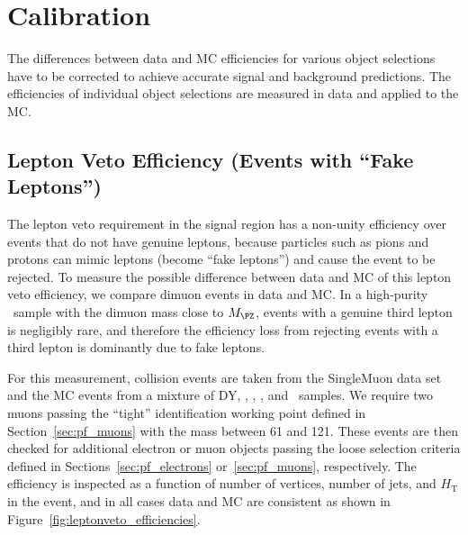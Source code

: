 \chapter{Calibration}
\label{chap:calibration}

The differences between data and MC efficiencies for various object selections have to be corrected to achieve accurate signal and background predictions.
The efficiencies of individual object selections are measured in data and applied to the MC.

\section{Lepton Veto Efficiency (Events with ``Fake Leptons'')}
\label{sec:fake_lepton_veto}
The lepton veto requirement in the signal region has a non-unity efficiency over events that do not have genuine leptons, because particles such as pions and protons can mimic leptons (become ``fake leptons'') and cause the event to be rejected. 
To measure the possible difference between data and MC of this lepton veto efficiency, we compare dimuon events in data and MC. 
In a high-purity \Zmm\  sample with the dimuon mass close to $M_{\PZ}$, events with a genuine third lepton is negligibly rare, and therefore the efficiency loss from rejecting events with a third lepton is dominantly due to fake leptons.

For this measurement, collision events are taken from the SingleMuon data set and the MC events from a mixture of DY, \ttbar, \PW\PW, \PW\PZ, and \PZ\PZ\ samples. 
We require two muons passing the ``tight'' identification working point defined in Section~\ref{sec:pf_muons} with the mass between 61 and 121\GeV. 
These events are then checked for additional electron or muon objects passing the loose selection criteria defined in Sections~\ref{sec:pf_electrons} or~\ref{sec:pf_muons}, respectively. 
The efficiency is inspected as a function of number of vertices, number of jets, and $H_{\mathrm{T}}$ in the event, and in all cases data and MC are consistent as shown in Figure~\ref{fig:leptonveto_efficiencies}.

